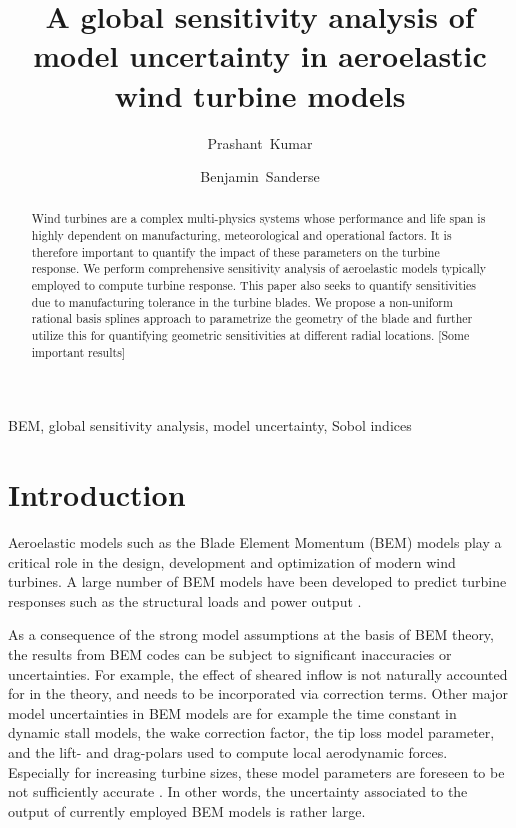 \documentclass[review]{elsarticle}
\numberwithin{equation}{section}
\numberwithin{equation}{section}
\begin{document}
\begin{frontmatter}
\title{A global sensitivity analysis of model uncertainty in aeroelastic wind turbine models}

\address[cwi]{Centrum Wiskunde \& Informatica (CWI), Amsterdam, The Netherlands}
\author[]{Prashant~Kumar}

\author{Benjamin~Sanderse}

\begin{abstract}
Wind turbines are a complex multi-physics systems whose performance and life span is highly dependent on manufacturing, meteorological and operational factors. It is therefore important to quantify the impact of these parameters on the turbine response. We perform comprehensive sensitivity analysis of aeroelastic models typically employed to compute turbine response. This paper also seeks to quantify sensitivities due to manufacturing tolerance in the turbine blades. We propose a non-uniform rational basis splines approach to parametrize the geometry of the blade and further utilize this for quantifying geometric sensitivities at different radial locations. [Some important results]
\end{abstract}
\begin{keyword}
BEM, global sensitivity analysis, model uncertainty, Sobol indices
\end{keyword}
\end{frontmatter}

\linenumbers

\section{Introduction}
Aeroelastic models such as the Blade Element Momentum (BEM) models \cite{HandBook} play a critical role in the design, development and optimization of modern wind turbines. A large number of BEM models have been developed to predict turbine responses such as the structural loads and power output \cite{Vorpahl2013}. 

As a consequence of the strong model assumptions at the basis of BEM theory, the results from BEM codes can be subject to significant inaccuracies or uncertainties. For example, the effect of sheared inflow \cite{Madsen2012} is not naturally accounted for in the theory, and needs to be incorporated via correction terms. Other major model uncertainties in BEM models are for example the time constant in dynamic stall models, the wake correction factor, the tip loss model parameter, and the lift- and drag-polars used to compute local aerodynamic forces. Especially for increasing turbine sizes, these model parameters  are foreseen to be not sufficiently accurate \cite{Sayed2019}. In other words, the uncertainty associated to the output of currently employed BEM models is rather large. 
\end{document}
